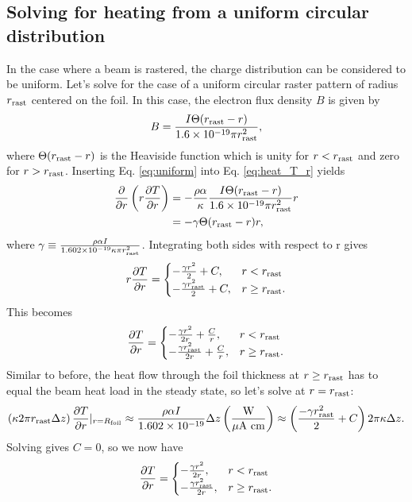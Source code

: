\documentclass[12pt]{article}
\begin{document}
\subsection{Solving for heating from a uniform circular distribution}
In the case where a beam is rastered, the charge distribution can be considered to be uniform. Let's solve for the case of a uniform circular raster pattern of radius $r_{\rm rast}$ centered on the foil. In this case, the electron flux density $B$ is given by
\begin{equation}
\label{eq:uniform}
B=\frac{I\Theta (r_{\rm rast}-r)}{1.6\times 10^{-19}\pi r_{\rm rast}^2},
\end{equation}
where $\Theta (r_{\rm rast}-r)$ is the Heaviside function which is unity for $r<r_{\rm rast}$ and  zero for $r>r_{\rm rast}$. Inserting Eq. \ref{eq:uniform} into Eq. \ref{eq:heat_T_r} yields
\begin{align}
\frac{\partial}{\partial r}\left(r\frac{\partial T}{\partial r}\right)&=-\frac{\rho\alpha}{\kappa}\frac{I\Theta (r_{\rm rast}-r)}{1.6\times 10^{-19}\pi r_{\rm rast}^2}r\\
~&=-\gamma \Theta (r_{\rm rast}-r)r,
\end{align}
where $\gamma\equiv\frac{\rho\alpha I}{1.602\times10^{-19}\kappa\pi r_{\rm rast}^2}$. Integrating both sides with respect to r gives
\[
r\frac{\partial T}{\partial r}=
\begin{cases}
-\frac{\gamma r^2}{2}+C, & r<r_{\rm rast}\\
-\frac{\gamma r_{\rm rast}^2}{2}+C, & r\geq r_{\rm rast}.
\end{cases}
\]
This becomes
\[
\frac{\partial T}{\partial r}=
\begin{cases}
-\frac{\gamma r^2}{2r}+\frac{C}{r}, & r<r_{\rm rast}\\
-\frac{\gamma r_{\rm rast}^2}{2r}+\frac{C}{r}, & r\geq r_{\rm rast}.
\end{cases}
\]
Similar to before, the heat flow through the foil thickness at $r\geq r_{\rm rast} $ has to equal the beam heat load in the steady state, so let's solve at $r=r_{\rm rast}$:
\[
\left(\kappa2\pi r_{\rm rast}\Delta z\right) \frac{\partial T}{\partial r}|_{r=R_{\rm foil}}\approx \frac{\rho\alpha I}{1.602\times 10^{-19}}\Delta z\left(\frac{\textrm{W}}{\mu \textrm{A cm}}\right)\approx\left( \frac{-\gamma r_{\rm rast}^2}{2}+C\right)2\pi\kappa\Delta z.
\]
Solving gives $C=0$, so we now have
\begin{equation}
\label{eq:uniform_cases}
\frac{\partial T}{\partial r}=
\begin{cases}
-\frac{\gamma r^2}{2r}, & r<r_{\rm rast}\\
-\frac{\gamma r_{\rm rast}^2}{2r}, & r\geq r_{\rm rast}.
\end{cases}
\end{equation}
\end{document}
